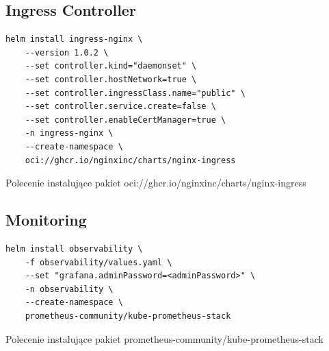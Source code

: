 
\subsection{Ingress Controller}\label{subsec:ingress-controller}


\begin{listing}[H]
    \begin{verbatim}
helm install ingress-nginx \
    --version 1.0.2 \
    --set controller.kind="daemonset" \
    --set controller.hostNetwork=true \
    --set controller.ingressClass.name="public" \
    --set controller.service.create=false \
    --set controller.enableCertManager=true \
    -n ingress-nginx \
    --create-namespace \
    oci://ghcr.io/nginxinc/charts/nginx-ingress
    \end{verbatim}
    \caption{Polecenie instalujące pakiet oci://ghcr.io/nginxinc/charts/nginx-ingress}
    \label{lst:helm-install-ingress-controller}
\end{listing}


\subsection{Monitoring}\label{subsec:monitoring}

\todo{Observability Plane}

\begin{listing}[H]
    \begin{verbatim}
helm install observability \
    -f observability/values.yaml \
    --set "grafana.adminPassword=<adminPassword>" \
    -n observability \
    --create-namespace \
    prometheus-community/kube-prometheus-stack
    \end{verbatim}
    \caption{Polecenie instalujące pakiet prometheus-community/kube-prometheus-stack}
    \label{lst:helm-install-observability}
\end{listing}

%

